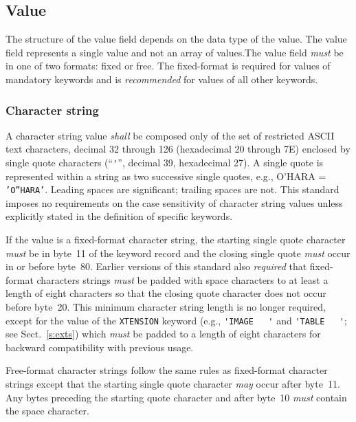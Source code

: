 \documentclass[onecolumn]{aa}
\begin{document}
  \subsection{Value}
   \label{s:valC}

   The structure of the value field depends on the data type 
   of the value.  The value field represents a single value and
   not an array of values.\footnotemark[1]  The value field {\em must} be in one of two formats:
   fixed or free.
   The fixed-format is required for values of 
   mandatory keywords
   and is {\em recommended} for values of all other keywords.  

   \subsubsection{Character string}  
   \label{s:ffch}
   
   A character string value 
   {\em shall} be composed only of the set of restricted ASCII text
   characters, decimal 32 through 126 (hexadecimal 20 through 7E) enclosed
   by single quote characters (``\verb+'+'', decimal 39, hexadecimal 27). 
   A single quote is represented within a string as two successive 
   single quotes, e.g., O'HARA = {\tt 'O''HARA'}. Leading spaces are
   significant; trailing spaces are not. 
   This standard imposes no 
   requirements on the case sensitivity
   of character string values
   unless explicitly stated in the definition of specific
   keywords.
     
   If the value is a fixed-format character string, the starting
   single quote character {\em must} be in byte~11 of the keyword record
   and the closing single quote {\em must} occur in or before byte~80.  
   Earlier versions of this standard also {\em required}
   that fixed-format characters strings {\em must} be padded with space characters
   to  at least a length of eight characters so that the closing quote character
   does not occur before byte~20.  This minimum character string length is
   no longer required, except for the value of the {\tt XTENSION} keyword
   (e.g., {\verb*+'IMAGE   '+} and {\verb*+'TABLE   '+}; see Sect.\ \ref{s:exts})
   which {\em must} be padded to a length of eight characters 
   for backward compatibility with previous usage.

Free-format character strings follow the same rules as fixed-format
character strings except that the starting single quote
character {\em may} occur after byte~11.  
Any bytes preceding the starting quote character and after
byte~10 {\em must} contain the space character.
\end{document}
